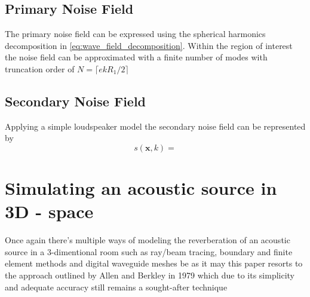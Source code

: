 \subsection{Primary Noise Field}
The primary noise field can be expressed using the spherical harmonics decomposition in \ref{eq:wave_field_decomposition}. Within the region of interest the noise field can be approximated with a finite number of modes with truncation order of $N = \lceil ekR_1/2\rceil$ 


\subsection{Secondary Noise Field}
Applying a simple loudspeaker model the secondary noise field can be represented by \cite{Zhang2019}
\begin{equation}
    s(\mathbf{x},k) = 
\end{equation}

\section{Simulating an acoustic source in 3D - space}
Once again there's multiple ways of modeling the reverberation of an acoustic source in a 3-dimentional room such as ray/beam tracing, boundary and finite element methods and digital waveguide meshes be as it may this paper resorts to the approach outlined by Allen and Berkley in 1979 which due to its simplicity and adequate accuracy still remains a sought-after technique \cite{Samarasinghe2018}

